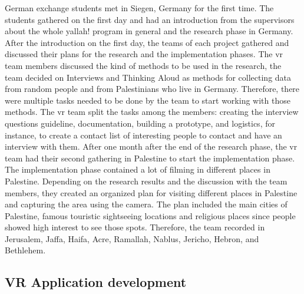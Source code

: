 German exchange students met in Siegen, Germany for the first time. The students gathered
on the first day and had an introduction from the supervisors about the whole \acrshort{yallah!}
program in general and the research phase in Germany. After the introduction on the first
day, the teams of each project gathered and discussed their plans for the research and the
implementation phases. The \acrshort{vr} team members discussed the kind of methods to be used in
the research, the team decided on Interviews and Thinking Aloud as methods for collecting
data from random people and from Palestinians who live in Germany. Therefore, there were
multiple tasks needed to be done by the team to start working with those methods. The \acrshort{vr}
team split the tasks among the members: creating the interview questions guideline,
documentation, building a prototype, and logistics, for instance, to create a contact list of
interesting people to contact and have an interview with them.
After one month after the end of the research phase, the \acrshort{vr} team had their second gathering
in Palestine to start the implementation phase. The implementation phase contained a lot of
filming in different places in Palestine. Depending on the research results and the discussion
with the team members, they created an organized plan for visiting different places in
Palestine and capturing the area using the camera. The plan included the main cities of
Palestine, famous touristic sightseeing locations and religious places since people showed
high interest to see those spots. Therefore, the team recorded in Jerusalem, Jaffa, Haifa, Acre, Ramallah, Nablus, Jericho, Hebron, and Bethlehem.

\subsection{VR Application development}

